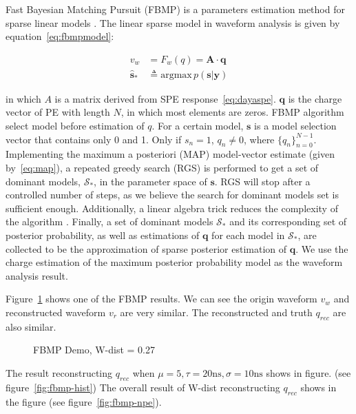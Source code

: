 Fast Bayesian Matching Pursuit (FBMP) is a parameters estimation method for sparse linear models \cite{schniter_fast_nodate}. The linear sparse model in waveform analysis is given by equation~\eqref{eq:fbmpmodel}: 

\begin{align}
    v_{w} &= F_{w}(q) = \boldsymbol{A}\cdot \boldsymbol{q} \label{eq:fbmpmodel} \\
    \hat{\boldsymbol{s}}_{*} &\triangleq \mathrm{argmax}\,p(\boldsymbol{s}|\boldsymbol{y}) \label{eq:map}
\end{align}

in which $A$ is a matrix derived from SPE response~\eqref{eq:dayaspe}. $\boldsymbol{q}$ is the charge vector of PE with length $N$, in which most elements are zeros. FBMP algorithm select model before estimation of $q$. For a certain model, $\boldsymbol{s}$ is a model selection vector that contains only 0 and 1. Only if $s_{n}=1$, $q_{n}\neq0$, where $\{q_{n}\}_{n=0}^{N-1}$. Implementing the maximum a posteriori (MAP) model-vector estimate (given by~\eqref{eq:map}), a repeated greedy search (RGS) is performed to get a set of dominant models, $\mathcal{S}_{*}$, in the parameter space of $\boldsymbol{s}$. RGS will stop after a controlled number of steps, as we believe the search for dominant models set is sufficient enough. Additionally, a linear algebra trick reduces the complexity of the algorithm \cite{schniter_fast_nodate}. Finally, a set of dominant models $\mathcal{S}_{*}$ and its corresponding set of posterior probability, as well as estimations of $\boldsymbol{q}$ for each model in $\mathcal{S}_{*}$, are collected to be the approximation of sparse posterior estimation of $\boldsymbol{q}$. We use the charge estimation of the maximum posterior probability model as the waveform analysis result. 

Figure~\ref{fig:fbmp} shows one of the FBMP results. We can see the origin waveform $v_{w}$ and reconstructed waveform $v_{r}$ are very similar. The reconstructed and truth $q_{rec}$ are also similar. 

\begin{figure}[H]
    \centering
    \scalebox{0.45}{}
    \caption{\label{fig:fbmp} FBMP Demo, W-dist = 0.27}
\end{figure}

The result reconstructing $q_{rec}$ when $\mu=5, \tau=20\mathrm{ns}, \sigma=10\mathrm{ns}$ shows in figure. (see figure~\ref{fig:fbmp-hist}) The overall result of W-dist reconstructing $q_{rec}$ shows in the figure (see figure~\ref{fig:fbmp-npe}). 


